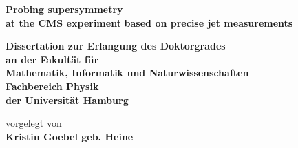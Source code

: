 \documentclass[
twoside,
headsepline,     %
headings=normal,
openright,
numbers=noenddot, %
a4paper
]{scrreprt} %
\author{Kristin Goebel}
\begin{document}
\begin{titlepage}
  \begin{center}
    \thispagestyle{empty}
    \vspace*{1cm}
    \begin{doublespace} 
       \textbf{\Huge Probing supersymmetry} \\
       \vskip0.4cm
       \textbf{\Huge at the CMS experiment}
       \vskip0.4cm
       \textbf{\Huge based on precise jet measurements}
      \vskip2.5cm
      \begin{Large} 
        \textbf{Dissertation zur Erlangung des Doktorgrades\\
          an der Fakult\"{a}t f\"{u}r \\
          Mathematik, Informatik und Naturwissenschaften\\
          Fachbereich Physik\\
          der Universit\"{a}t Hamburg\\}
      \end{Large}
      \vskip2cm
      \begin{large}
        vorgelegt von\\
        {\bf Kristin Goebel geb. Heine}\\
        \vfill
      \end{large}
    \end{doublespace} 
  \end{center}
\end{titlepage}



\end{document}
